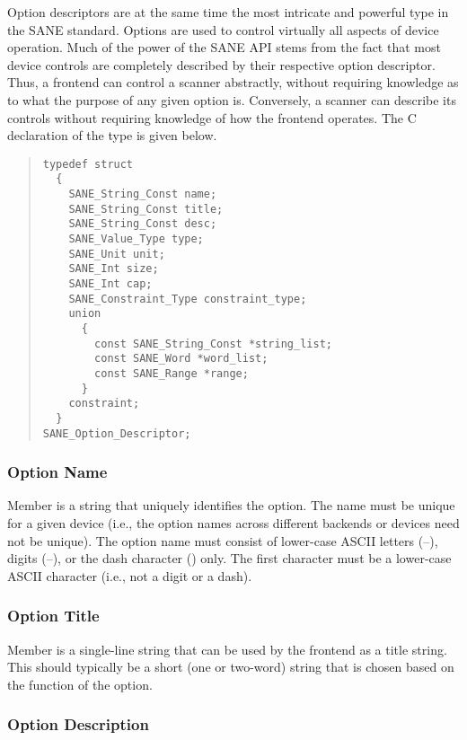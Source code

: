 \documentclass[11pt,DVIps]{report}
\begin{document}
Option descriptors are at the same time the most intricate and
powerful type in the SANE standard.  Options are used to control
virtually all aspects of device operation.  Much of the power of the
SANE API stems from the fact that most device controls are completely
described by their respective option descriptor.  Thus, a frontend can
control a scanner abstractly, without requiring knowledge as to what
the purpose of any given option is.  Conversely, a scanner can
describe its controls without requiring knowledge of how the frontend
operates.  The C declaration of the
 type is given below.
\begin{quote}
\begin{verbatim}
typedef struct
  {
    SANE_String_Const name;
    SANE_String_Const title;
    SANE_String_Const desc;
    SANE_Value_Type type;
    SANE_Unit unit;
    SANE_Int size;
    SANE_Int cap;
    SANE_Constraint_Type constraint_type;
    union
      {
        const SANE_String_Const *string_list;
        const SANE_Word *word_list;
        const SANE_Range *range;
      }
    constraint;
  }
SANE_Option_Descriptor;
\end{verbatim}
\end{quote}

\subsubsection{Option Name}

Member  is a string that uniquely identifies the option.
The name must be unique for a given device (i.e., the option names
across different backends or devices need not be unique).  The option
name must consist of lower-case ASCII letters (--),
digits (--), or the dash character (\code{-}) only.
The first character must be a lower-case ASCII character (i.e., not a
digit or a dash).

\subsubsection{Option Title}

Member  is a single-line string that can be used by the
frontend as a title string.  This should typically be a short (one or
two-word) string that is chosen based on the function of the option.

\subsubsection{Option Description}
\end{document}
